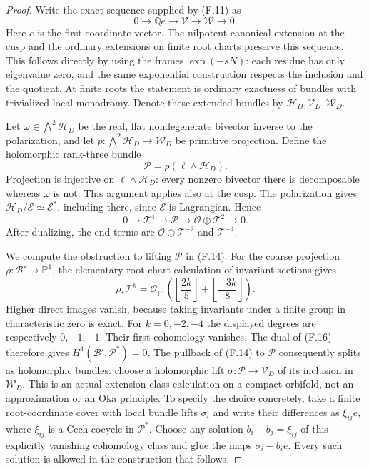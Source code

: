 \begin{proof}
Write the exact sequence supplied by (F.11) as
\[
 0\longrightarrow\mathbb Q e\longrightarrow\mathcal V
   \longrightarrow\mathcal W\longrightarrow0.
 \tag{F.14}
\]
Here $e$ is the first coordinate vector.  The nilpotent canonical
extension at the cusp and the ordinary extensions on finite root
charts preserve this sequence.  This follows directly by using
the frames $\exp(-sN)$: each residue has only eigenvalue zero,
and the same exponential construction respects the inclusion and
the quotient.  At finite roots the statement is ordinary exactness
of bundles with trivialized local monodromy.  Denote these extended
bundles by $\mathcal H_D,\mathcal V_D,\mathcal W_D$.

Let $\omega\in\bigwedge^2\mathcal H_D$ be the real, flat
nondegenerate bivector inverse to the polarization, and let
$p:\bigwedge^2\mathcal H_D\to\mathcal W_D$ be primitive projection.
Define the holomorphic rank-three bundle
\[
 \mathcal P=p(\ell\wedge\mathcal H_D).
 \tag{F.15}
\]
Projection is injective on $\ell\wedge\mathcal H_D$: every
nonzero bivector there is decomposable whereas $\omega$ is not.
This argument applies also at the cusp.  The polarization gives
$\mathcal H_D/\mathcal E\simeq\mathcal E^*$, including there,
since $\mathcal E$ is Lagrangian.  Hence
\[
 0\longrightarrow\mathcal T^4\longrightarrow\mathcal P
 \longrightarrow\mathcal O\oplus\mathcal T^2\longrightarrow0.
 \tag{F.16}
\]
After dualizing, the end terms are
$\mathcal O\oplus\mathcal T^{-2}$ and $\mathcal T^{-4}$.

We compute the obstruction to lifting $\mathcal P$ in (F.14).
For the coarse projection $\rho:\mathcal B'\to\mathbb P^1$,
the elementary root-chart calculation of invariant sections gives
\[
 \rho_*\mathcal T^k=
 \mathcal O_{\mathbb P^1}
 \left(\left\lfloor\frac{2k}{5}\right\rfloor+
       \left\lfloor\frac{-3k}{8}\right\rfloor\right).
 \tag{F.17}
\]
Higher direct images vanish, because taking invariants under a
finite group in characteristic zero is exact.  For $k=0,-2,-4$
the displayed degrees are respectively $0,-1,-1$.  Their first
cohomology vanishes.  The dual of (F.16) therefore gives
$H^1(\mathcal B',\mathcal P^*)=0$.
The pullback of (F.14) to $\mathcal P$ consequently splits as
holomorphic bundles: choose a holomorphic lift
$\sigma:\mathcal P\to\mathcal V_D$ of its inclusion in
$\mathcal W_D$.  This is an actual extension-class calculation
on a compact orbifold, not an approximation or an Oka principle.
To specify the choice concretely, take a finite root-coordinate
cover with local bundle lifts $\sigma_i$ and write their
differences as $\xi_{ij}e$, where
$\xi_{ij}$ is a Cech cocycle in $\mathcal P^*$.
Choose any solution $b_i-b_j=\xi_{ij}$ of this explicitly
vanishing cohomology class and glue the maps
$\sigma_i-b_ie$.  Every such solution is allowed in the
construction that follows.


\end{proof}
